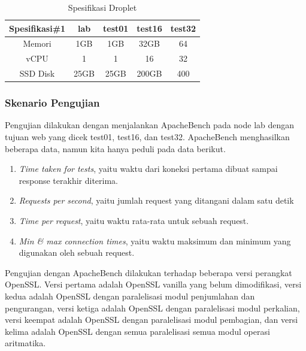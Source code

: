 \begin{table}[ht]
\caption{Spesifikasi Droplet} %
\label{tab:droplet_specs}
\centering %
\begin{tabular}{|| c | c c c c ||} %
\hline\hline %
Spesifikasi\#1 & lab & test01 & test16 & test32\\[0.5ex] %
\hline %
Memori    & 1GB   & 1GB   & 32GB  & 64 \\
vCPU      & 1     & 1     & 16    & 32 \\
SSD Disk  & 25GB  & 25GB  & 200GB & 400 \\ [1ex] %
\hline\hline %
\end{tabular}
\label{table:nonlin} %
\end{table}

\subsubsection{Skenario Pengujian}
Pengujian dilakukan dengan menjalankan ApacheBench pada node lab dengan tujuan web yang dicek test01, test16, dan test32. ApacheBench menghasilkan beberapa data, namun kita hanya peduli pada data berikut.
\begin{enumerate}[label=\roman*.]
  \item \textit{Time taken for tests}, yaitu waktu dari koneksi pertama dibuat sampai response terakhir diterima.
  \item \textit{Requests per second}, yaitu jumlah request yang ditangani dalam satu detik
  \item \textit{Time per request}, yaitu waktu rata-rata untuk sebuah request.
  \item \textit{Min \& max connection times}, yaitu waktu maksimum dan minimum yang digunakan oleh sebuah request.
\end{enumerate}

Pengujian dengan ApacheBench dilakukan terhadap beberapa versi perangkat OpenSSL. Versi pertama adalah OpenSSL vanilla yang belum dimodifikasi, versi kedua adalah OpenSSL dengan paralelisasi modul penjumlahan dan pengurangan, versi ketiga adalah OpenSSL dengan paralelisasi modul perkalian, versi keempat adalah OpenSSL dengan paralelisasi modul pembagian, dan versi kelima adalah OpenSSL dengan semua paralelisasi semua modul operasi aritmatika.

